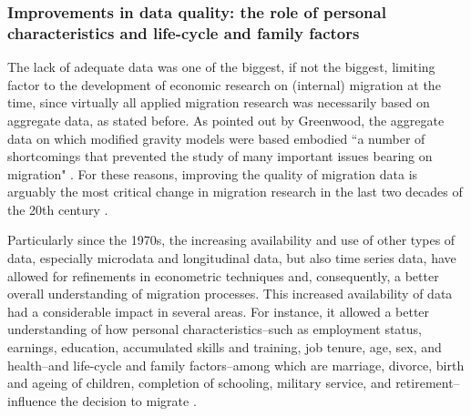 \subsubsection{Improvements in data quality: the role of personal characteristics and life-cycle and family factors}

The lack of adequate data was one of the biggest, if not the biggest, limiting factor to the development of economic research on (internal) migration at the time, since virtually all applied migration research was necessarily based on aggregate data, as stated before. As pointed out by Greenwood, the aggregate data on which modified gravity models were based embodied ``a number of shortcomings that prevented the study of many important issues bearing on migration" \citep[p. 707]{greenwood_internal_1997}. For these reasons, improving the quality of migration data is arguably the most critical change in migration research in the last two decades of the 20th century \citep{greenwood_internal_1997}. 

Particularly since the 1970s, the increasing availability and use of other types of data, especially microdata and longitudinal data, but also time series data, have allowed for refinements in econometric techniques and, consequently, a better overall understanding of migration processes. This increased availability of data had a considerable impact in several areas. For instance, it allowed a better understanding of how personal characteristics--such as employment status, earnings, education, accumulated skills and training, job tenure, age, sex, and health--and life-cycle and family factors--among which are marriage, divorce, birth and ageing of children, completion of schooling, military service, and retirement--influence the decision to migrate \citep{greenwood_human_1985, greenwood_internal_1997}. 

